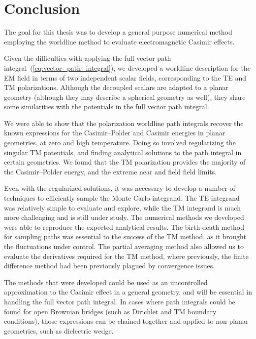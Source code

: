 \chapter{Conclusion}

The goal for this thesis was to develop a general purpose numerical method
employing the worldline method to evaluate electromagnetic Casimir effects. 

Given the difficulties with applying the full vector path integral~(\ref{eq:vector_path_integral}), 
we developed a worldline description for the EM field in terms of two independent scalar fields, corresponding 
to the TE and TM polarizations.   Although the decoupled scalars are adapted to a planar geometry (although they may describe
a spherical geometry as well), they share some similarities with the potentials in the full vector
path integral.  

We were able to show that the polarization worldline path integrals recover the known expressions for the 
Casimir--Polder and Casimir energies in planar geometries, at zero and high temperature.  
Doing so involved regularizing the singular TM potentials, and finding analytical solutions to the path integral
in certain geometries.  We found that the TM polarization provides the majority of the Casimir--Polder energy,
and the extreme near and field field limits.

Even with the regularized solutions, it was necessary to develop a number of techniques to efficiently
sample the Monte Carlo integrand.  The TE integrand was relatively simple to evaluate and explore, while the TM
integrand is much more challenging and is still under study.
The numerical methods we developed were able to reproduce the expected analytical results.
The birth-death method for sampling paths was essential to the success of the TM method, as it 
brought the fluctuations under control.  
The partial averaging method also allowed us to evaluate the derivatives required for the TM method,
where previously, the finite difference method had been previously plagued by convergence issues.

The methods that were developed could be used as an uncontrolled approximation to the Casimir effect in a general geometry.
and will be essential in handling the full vector path integral.    
In cases where path integrals could be found for open Brownian bridges (such as
Dirichlet and TM boundary conditions), those expressions can be chained together and applied to non-planar
geometries, such as dielectric wedge.    

